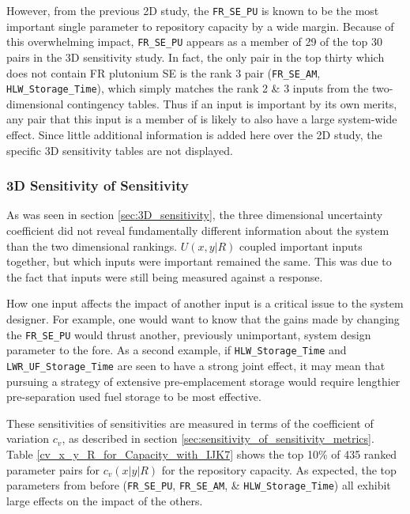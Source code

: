 However, from the previous 2D study, the \texttt{FR\_SE\_PU}
is known to be the most important single parameter to repository capacity by a wide 
margin.  Because of this overwhelming impact, \texttt{FR\_SE\_PU} appears as a member of
29 of the top 30 pairs in the 3D sensitivity study.  In fact, the only pair in the 
top thirty which does not contain FR plutonium SE is the rank 3 pair
(\texttt{FR\_SE\_AM}, \texttt{HLW\_Storage\_Time}), which simply matches the 
rank 2 \& 3 inputs from the two-dimensional contingency tables.
Thus if an input is important by its own merits, any pair that this input is 
a member of is likely to also have a large system-wide effect.
Since little additional information is added here over the 2D study, the specific 
3D sensitivity tables are not displayed.

\subsubsection{3D Sensitivity of Sensitivity}
\label{cts_sec:3D_sensitivity_of_sensitivity}

As was seen in section \ref{sec:3D_sensitivity}, the three dimensional 
uncertainty coefficient did not reveal fundamentally different information
about the system than the two dimensional rankings.  $U(x,y|R)$ coupled 
important inputs together, but which inputs were important remained the same.  This was
due to the fact that inputs were still being measured against a response.

How one input affects the impact of another input is a critical issue to the system designer.  
For example, one would want to know that the gains made by
changing the \texttt{FR\_SE\_PU} would thrust another, previously unimportant, system design 
parameter to the fore.  As a second example, if \texttt{HLW\_Storage\_Time} and 
\texttt{LWR\_UF\_Storage\_Time} are seen to have a strong joint effect, it may 
mean that pursuing a strategy of extensive pre-emplacement storage would require 
lengthier pre-separation used fuel storage to be most effective.



These sensitivities of sensitivities are measured in terms of the coefficient of 
variation $c_v$, as described in section \ref{sec:sensitivity_of_sensitivity_metrics}.
Table \ref{cv_x_y_R_for_Capacity_with_IJK7} shows the top 10\% of 435 ranked parameter 
pairs for $c_v(x|y|R)$ for the repository capacity.
As expected, the top parameters from before (\texttt{FR\_SE\_PU}, \texttt{FR\_SE\_AM}, 
\& \texttt{HLW\_Storage\_Time}) all exhibit large effects on
the impact of the others.

